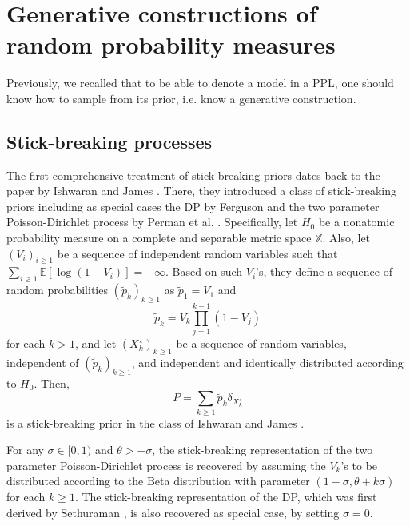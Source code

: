 \section{Generative constructions of random probability measures} \label{SBS}
Previously, we recalled that to be able to denote a model in a \gls{PPL}, one should know how to sample from its prior, i.e. know a generative construction.

\subsection{Stick-breaking processes} \label{stick-breaking}

The first comprehensive treatment of stick-breaking priors dates back to the paper by Ishwaran and James \cite{Ishwaran:2001dw}. There, they introduced a class of stick-breaking priors including as special cases the \acrlong{DP} by Ferguson \cite{ferguson73} and the two parameter Poisson-Dirichlet process by Perman et al. \cite{Perman:1992ke}. Specifically, let $H_0$ be a nonatomic probability measure on a complete and separable metric space $\mathbb{X}$.
Also, let $(V_i)_{i \ge 1}$ be a sequence of independent random variables such that $\sum_{i \ge 1}{\mathbb{E}[\log(1 - V_i)]} = - \infty$.
Based on such $V_i$'s, they define a sequence of random probabilities $(\tilde{p}_k)_{k \ge 1}$ as $\tilde{p}_1 = V_1$ and
\begin{equation} \label{eq:Stick_breaking}
\tilde{p}_k = V_k \prod_{j=1}^{k-1}{(1-V_j)} 
\end{equation}
for each $k > 1$, and let $(X^\star_k)_{k \ge 1}$ be a sequence of random variables, independent
of $(\tilde{p}_k)_{k \ge 1}$, and independent and identically distributed according to $H_0$. Then,
$$ P = \sum_{k \ge 1}{\tilde{p}_k \delta_{X_k^\star}} $$
is a stick-breaking prior in the class of Ishwaran and James \cite{Ishwaran:2001dw}.

For any $\sigma \in [0,1)$ and $\theta > -\sigma$, the stick-breaking representation of the two parameter Poisson-Dirichlet process is recovered by assuming the $V_k$'s to be distributed according to the Beta distribution with parameter $(1 - \sigma, \theta + k\sigma)$ for each $k \ge 1$.
The stick-breaking representation of the \gls{DP}, which was first derived by Sethuraman \cite{sethuraman94}, is also recovered as special case, by setting $\sigma = 0$.

